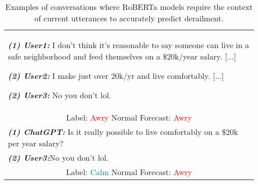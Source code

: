\begin{table}[ht]
    \renewcommand{\arraystretch}{1.0}
        \begin{tabularx}{\linewidth}{|X|}
            \hline
            \textbf{\textit{(1) User1:}} I don't think it's reasonable to say someone can live in a safe neighborhood and feed themselves on a \$20k/year salary. [...]
    
            \textbf{\textit{(2) User2:}} I make just over 20k/yr and live comfortably. [...]
            
            \textbf{\textit{(2) User3:}} No you don't lol.
            \\
            \multicolumn{1}{|c|}{Label: \textcolor{red}{Awry}\quad        
            Normal Forecast: \textcolor{red}{Awry}}\\
            
            \hline
    
           \textbf{\textit{(1) ChatGPT:}} Is it really possible to live comfortably on a \$20k per year salary?
           \\
            \textbf{\textit{(2) User3:}}No you don't lol.
            \\ \multicolumn{1}{|c|}{Label: \textcolor{teal}{Calm}\quad
            Normal Forecast: \textcolor{red}{Awry}}
            \\
            
            \hline
    
        \end{tabularx}
    
    \caption{Examples of conversations where RoBERTa models require the context of current utterances to accurately predict derailment.}
    \label{tab:trama-example}
    \end{table}
